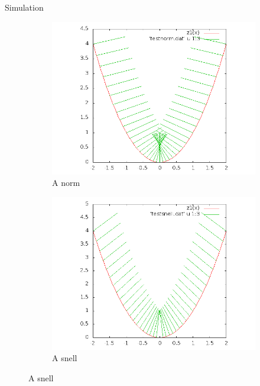 \documentclass{beamer}
\begin{document}
\begin{frame}{Simulation}

\begin{figure}
\centering
\begin{subfigure}{.5\textwidth}
  \centering
  \includegraphics[scale=.3]{out.png}
  \caption{A norm}
  \label{fig:sub1}
\end{subfigure}%
\begin{subfigure}{.5\textwidth}
  \centering
  \includegraphics[scale=.3]{out2.png}
  \caption{A snell}
  \label{fig:sub2}
\end{subfigure}
\label{fig:test}
\end{figure}


\end{frame}
\end{document}
